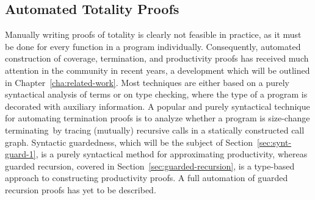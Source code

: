 \subsection{Automated Totality Proofs}
Manually writing proofs of totality is clearly not feasible in practice, as it
must be done for every function in a program individually. Consequently,
automated construction of coverage, termination, and productivity proofs has
received much attention in the community in recent years, a development which
will be outlined in Chapter~\ref{cha:related-work}. Most techniques are either
based on a purely syntactical analysis of terms or on type checking, where the
type of a program is decorated with auxiliary information. A popular and purely
syntactical technique for automating termination proofs is to analyze whether a
program is size-change terminating\,\citep{LeeJones01SizeChange} by tracing
(mutually) recursive calls in a statically constructed call graph. Syntactic
guardedness, which will be the subject of Section~\ref{sec:synt-guard-1}, is a
purely syntactical method for approximating productivity, whereas guarded
recursion, covered in Section~\ref{sec:guarded-recursion}, is a type-based
approach to constructing productivity proofs. A full automation of guarded recursion
proofs has yet to be described.


